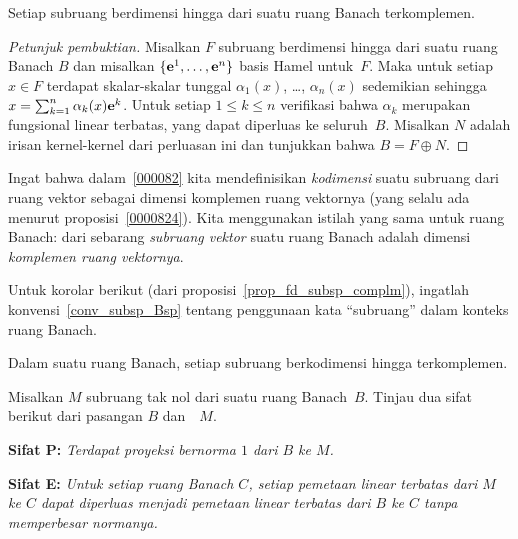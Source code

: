 \begin{prop}\label{prop_fd_subsp_complm} Setiap subruang berdimensi hingga dari suatu ruang Banach terkomplemen.
\end{prop}

\begin{proof}[\emph{Petunjuk pembuktian}] Misalkan $F$ subruang berdimensi hingga dari suatu ruang Banach $B$ dan misalkan
$\{\mathbf{e}^1, \dots, \mathbf{e}^n\}$ basis Hamel untuk~$F$. Maka untuk setiap $x \in F$ terdapat skalar-skalar tunggal
$\alpha_1(x)$, \dots , $\alpha_n(x)$ sedemikian sehingga $x = \sum_{k=1}^n \alpha_k(x)\mathbf{e}^k$. Untuk setiap $1 \le k \le n$
verifikasi bahwa $\alpha_k$ merupakan fungsional linear terbatas, yang dapat diperluas ke seluruh~$B$. Misalkan $N$ adalah
irisan kernel-kernel dari perluasan ini dan tunjukkan bahwa $B = F \oplus N$.  \ns
\end{proof}

\begin{defn} Ingat bahwa dalam~\ref{000082} kita mendefinisikan \emph{kodimensi} suatu subruang dari ruang vektor
sebagai dimensi komplemen ruang vektornya (yang selalu ada menurut proposisi~\ref{0000824}). Kita menggunakan
istilah yang sama untuk ruang Banach:
 dari sebarang \emph{subruang vektor} suatu ruang Banach adalah dimensi \emph{komplemen ruang
vektornya}.
\end{defn}

Untuk korolar berikut (dari proposisi~\ref{prop_fd_subsp_complm}), ingatlah
konvensi~\ref{conv_subsp_Bsp} tentang penggunaan kata ``subruang'' dalam konteks ruang Banach.

\begin{cor} Dalam suatu ruang Banach, setiap subruang berkodimensi hingga terkomplemen.
\end{cor}





















Misalkan $M$ subruang tak nol dari suatu ruang Banach~$B$. Tinjau dua sifat berikut dari pasangan $B$ dan~~$M$.

\textbf{Sifat P:} \emph{Terdapat proyeksi bernorma $1$ dari $B$ ke $M$.}

\textbf{Sifat E:} \emph{Untuk setiap ruang Banach $C$, setiap pemetaan linear terbatas dari $M$ ke $C$ dapat diperluas menjadi pemetaan
linear terbatas dari $B$ ke $C$ tanpa memperbesar normanya.}

